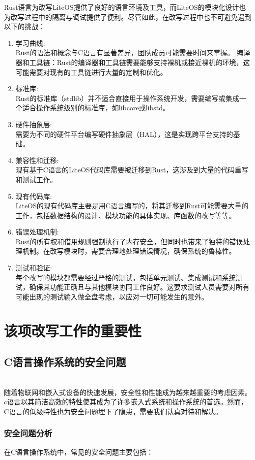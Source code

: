 \documentclass{ctexart}
\begin{document}
\indent Rust语言为改写LiteOS提供了良好的语言环境及工具，而LiteOS的模块化设计也为改写过程中的隔离与调试提供了便利。尽管如此，在改写过程中也不可避免遇到以下的挑战：
\begin{enumerate}
\item 学习曲线:\\
Rust的语法和概念与C语言有显著差异，团队成员可能需要时间来掌握。
编译器和工具链：Rust的编译器和工具链需要能够支持裸机或接近裸机的环境，这可能需要对现有的工具链进行大量的定制和优化。
\item 标准库:\\
Rust的标准库（stdlib）并不适合直接用于操作系统开发，需要编写或集成一个适合操作系统级别的标准库，如libcore或libstd。
\item 硬件抽象层:\\
需要为不同的硬件平台编写硬件抽象层（HAL），这是实现跨平台支持的基础。
\item 兼容性和迁移:\\
现有基于C语言的LiteOS代码库需要被迁移到Rust，这涉及到大量的代码重写和测试工作。
\item 现有代码库:\\
LiteOS的现有代码库主要是用C语言编写的，将其迁移到Rust可能需要大量的工作，包括数据结构的设计、模块功能的具体实现、库函数的改写等等。
\item 错误处理机制:\\
Rust的所有权和借用规则强制执行了内存安全，但同时也带来了独特的错误处理机制。在改写模块时，需要合理地处理错误情况，确保系统的鲁棒性。
\item 测试和验证:\\
每个改写的模块都需要经过严格的测试，包括单元测试、集成测试和系统测试，确保其功能正确且与其他模块协同工作良好。这要求测试人员需要对所有可能出现的测试输入做全盘考虑，以应对一切可能发生的意外。
\end{enumerate}
\section{该项改写工作的重要性}
\subsection{C语言操作系统的安全问题}\ \\
\indent 随着物联网和嵌入式设备的快速发展，安全性和性能成为越来越重要的考虑因素。c语言以其简洁高效的特性使其成为了许多嵌入式系统和操作系统的首选。然而，C语言的低级特性也为安全问题埋下了隐患，需要我们认真对待和解决。
\subsubsection{安全问题分析}
在C语言操作系统中，常见的安全问题主要包括：
\end{document}
